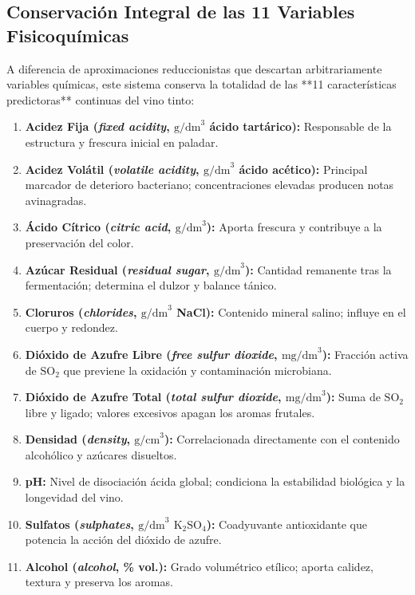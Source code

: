 \documentclass[11pt,a4paper]{article}
\begin{document}
\subsection{Conservación Integral de las 11 Variables Fisicoquímicas}
A diferencia de aproximaciones reduccionistas que descartan arbitrariamente variables químicas, este sistema conserva la totalidad de las **11 características predictoras** continuas del vino tinto:
\begin{enumerate}[noitemsep]
    \item \textbf{Acidez Fija (\textit{fixed acidity}, $\text{g/dm}^3$ ácido tartárico):} Responsable de la estructura y frescura inicial en paladar.
    \item \textbf{Acidez Volátil (\textit{volatile acidity}, $\text{g/dm}^3$ ácido acético):} Principal marcador de deterioro bacteriano; concentraciones elevadas producen notas avinagradas.
    \item \textbf{Ácido Cítrico (\textit{citric acid}, $\text{g/dm}^3$):} Aporta frescura y contribuye a la preservación del color.
    \item \textbf{Azúcar Residual (\textit{residual sugar}, $\text{g/dm}^3$):} Cantidad remanente tras la fermentación; determina el dulzor y balance tánico.
    \item \textbf{Cloruros (\textit{chlorides}, $\text{g/dm}^3$ NaCl):} Contenido mineral salino; influye en el cuerpo y redondez.
    \item \textbf{Dióxido de Azufre Libre (\textit{free sulfur dioxide}, $\text{mg/dm}^3$):} Fracción activa de $\text{SO}_2$ que previene la oxidación y contaminación microbiana.
    \item \textbf{Dióxido de Azufre Total (\textit{total sulfur dioxide}, $\text{mg/dm}^3$):} Suma de $\text{SO}_2$ libre y ligado; valores excesivos apagan los aromas frutales.
    \item \textbf{Densidad (\textit{density}, $\text{g/cm}^3$):} Correlacionada directamente con el contenido alcohólico y azúcares disueltos.
    \item \textbf{pH:} Nivel de disociación ácida global; condiciona la estabilidad biológica y la longevidad del vino.
    \item \textbf{Sulfatos (\textit{sulphates}, $\text{g/dm}^3$ $\text{K}_2\text{SO}_4$):} Coadyuvante antioxidante que potencia la acción del dióxido de azufre.
    \item \textbf{Alcohol (\textit{alcohol}, \% vol.):} Grado volumétrico etílico; aporta calidez, textura y preserva los aromas.
\end{enumerate}
\end{document}
